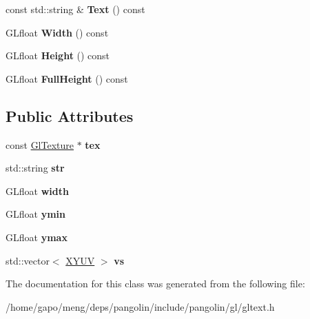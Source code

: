 \begin{DoxyCompactItemize}
\item 
const std\+::string \& {\bfseries Text} () const \hypertarget{classpangolin_1_1_gl_text_afa0399233f7cf0840b16853291b817a1}{}\label{classpangolin_1_1_gl_text_afa0399233f7cf0840b16853291b817a1}

\item 
G\+Lfloat {\bfseries Width} () const \hypertarget{classpangolin_1_1_gl_text_a0b30ad96ac8a8ec1eea988590bfdc4e0}{}\label{classpangolin_1_1_gl_text_a0b30ad96ac8a8ec1eea988590bfdc4e0}

\item 
G\+Lfloat {\bfseries Height} () const \hypertarget{classpangolin_1_1_gl_text_ac7caf155d21a0ebfefd4aa88f9a31530}{}\label{classpangolin_1_1_gl_text_ac7caf155d21a0ebfefd4aa88f9a31530}

\item 
G\+Lfloat {\bfseries Full\+Height} () const \hypertarget{classpangolin_1_1_gl_text_a1e0e66fb85d375e923553d5e5f46b8ec}{}\label{classpangolin_1_1_gl_text_a1e0e66fb85d375e923553d5e5f46b8ec}

\end{DoxyCompactItemize}
\subsection*{Public Attributes}
\begin{DoxyCompactItemize}
\item 
const \hyperlink{classpangolin_1_1_gl_texture}{Gl\+Texture} $\ast$ {\bfseries tex}\hypertarget{classpangolin_1_1_gl_text_a0f67ea2fa7e61ac75cdf7425b69811c0}{}\label{classpangolin_1_1_gl_text_a0f67ea2fa7e61ac75cdf7425b69811c0}

\item 
std\+::string {\bfseries str}\hypertarget{classpangolin_1_1_gl_text_a188146b599b31f8d27b7d7eada5a5d98}{}\label{classpangolin_1_1_gl_text_a188146b599b31f8d27b7d7eada5a5d98}

\item 
G\+Lfloat {\bfseries width}\hypertarget{classpangolin_1_1_gl_text_acdd19374b030621fee47ced19fd60c7e}{}\label{classpangolin_1_1_gl_text_acdd19374b030621fee47ced19fd60c7e}

\item 
G\+Lfloat {\bfseries ymin}\hypertarget{classpangolin_1_1_gl_text_a37d65bd516b9ebc1f7b2f63309741a3c}{}\label{classpangolin_1_1_gl_text_a37d65bd516b9ebc1f7b2f63309741a3c}

\item 
G\+Lfloat {\bfseries ymax}\hypertarget{classpangolin_1_1_gl_text_a1efac36dcdb3ee29b501195fa6723800}{}\label{classpangolin_1_1_gl_text_a1efac36dcdb3ee29b501195fa6723800}

\item 
std\+::vector$<$ \hyperlink{structpangolin_1_1_x_y_u_v}{X\+Y\+UV} $>$ {\bfseries vs}\hypertarget{classpangolin_1_1_gl_text_a1f512a84a6d2f4146d19a7578dfebfa2}{}\label{classpangolin_1_1_gl_text_a1f512a84a6d2f4146d19a7578dfebfa2}

\end{DoxyCompactItemize}


The documentation for this class was generated from the following file\+:\begin{DoxyCompactItemize}
\item 
/home/gapo/meng/deps/pangolin/include/pangolin/gl/gltext.\+h\end{DoxyCompactItemize}
